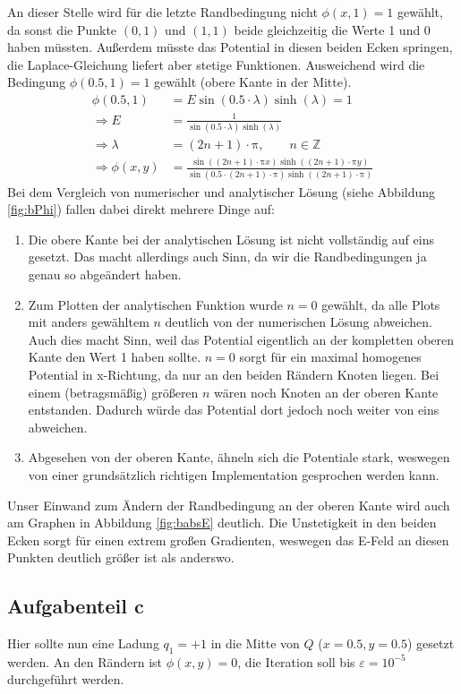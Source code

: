 An dieser Stelle wird für die letzte Randbedingung nicht $\phi(x,1) = 1$ gewählt, da sonst die Punkte $(0,1)$ und $(1,1)$ beide gleichzeitig die Werte 1 und 0 haben müssten.
Außerdem müsste das Potential in diesen beiden Ecken springen, die Laplace-Gleichung liefert aber stetige Funktionen.
Ausweichend wird die Bedingung $\phi(0.5,1) = 1$ gewählt (obere Kante in der Mitte).
\begin{align}
    \phi(0.5,1) &= E\sin(0.5\cdot\lambda)\sinh(\lambda) = 1 \\
    \Rightarrow E &= \frac{1}{\sin(0.5\cdot\lambda)\sinh(\lambda)} \\
    \Rightarrow \lambda &= (2n+1)\cdot\mathup{\pi}, \qquad n\in\mathbb{Z} \\
    \Rightarrow \phi(x,y) &= \frac{\sin((2n+1)\cdot\mathup{\pi} x)\sinh((2n+1)\cdot\mathup{\pi} y)}{\sin(0.5\cdot(2n+1)\cdot\mathup{\pi})\sinh((2n+1)\cdot\mathup{\pi})}
\end{align}
Bei dem Vergleich von numerischer und analytischer Lösung (siehe Abbildung \ref{fig:bPhi}) fallen dabei direkt mehrere Dinge auf:
\begin{enumerate}
    \item Die obere Kante bei der analytischen Lösung ist nicht vollständig auf eins gesetzt.
    Das macht allerdings auch Sinn, da wir die Randbedingungen ja genau so abgeändert haben.
    \item Zum Plotten der analytischen Funktion wurde $n = 0$ gewählt, da alle Plots mit anders gewähltem $n$ deutlich von der numerischen Lösung abweichen.
    Auch dies macht Sinn, weil das Potential eigentlich an der kompletten oberen Kante den Wert 1 haben sollte.
    $n = 0$ sorgt für ein maximal homogenes Potential in x-Richtung, da nur an den beiden Rändern Knoten liegen.
    Bei einem (betragsmäßig) größeren $n$ wären noch Knoten an der oberen Kante entstanden.
    Dadurch würde das Potential dort jedoch noch weiter von eins abweichen.
    \item Abgesehen von der oberen Kante, ähneln sich die Potentiale stark, weswegen von einer grundsätzlich richtigen Implementation gesprochen werden kann.
\end{enumerate}
Unser Einwand zum Ändern der Randbedingung an der oberen Kante wird auch am Graphen in Abbildung \ref{fig:babsE} deutlich.
Die Unstetigkeit in den beiden Ecken sorgt für einen extrem großen Gradienten, weswegen das E-Feld an diesen Punkten deutlich größer ist als anderswo.
\subsection*{Aufgabenteil c}
Hier sollte nun eine Ladung $q_1 = +1$ in die Mitte von $Q$ ($x=0.5, y=0.5$) gesetzt werden. An den Rändern ist $\phi(x,y) = 0$, die Iteration soll bis $\varepsilon = 10^{-5}$ durchgeführt werden.

